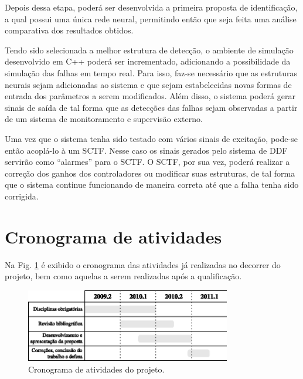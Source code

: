 Depois dessa etapa, poderá ser desenvolvida a primeira proposta de
identificação, a qual possui uma única rede neural, permitindo então que seja
feita uma análise comparativa dos resultados obtidos.

Tendo sido selecionada a melhor estrutura de detecção, o ambiente de simulação
desenvolvido em C++ poderá ser incrementado, adicionando a possibilidade da
simulação das falhas em tempo real. Para isso, faz-se necessário que as
estruturas neurais sejam adicionadas ao sistema e que sejam estabelecidas novas
formas de entrada dos parâmetros a serem modificados. Além disso, o sistema
poderá gerar sinais de saída de tal forma que as detecções das falhas sejam
observadas a partir de um sistema de monitoramento e supervisão externo. 

Uma vez que o sistema tenha sido testado com vários sinais de excitação, pode-se
então acoplá-lo à um SCTF. Nesse caso os sinais gerados pelo sistema de DDF
servirão como ``alarmes'' para o SCTF. O SCTF, por sua vez, poderá realizar a
correção dos ganhos dos controladores ou modificar suas estruturas, de tal forma
que o sistema continue funcionando de maneira correta até que a falha tenha sido
corrigida.

\section{Cronograma de atividades}
Na Fig. \ref{fig:cronograma} é exibido o cronograma das atividades já realizadas
no decorrer do projeto, bem como aquelas a serem realizadas após a qualificação.

\begin{figure}[htb]
\centering
    \includegraphics[width=0.8\textwidth]{imgs/conclusoes/eps/cronograma}
    \caption{Cronograma de atividades do projeto.}
    \label{fig:cronograma}
\end{figure}
